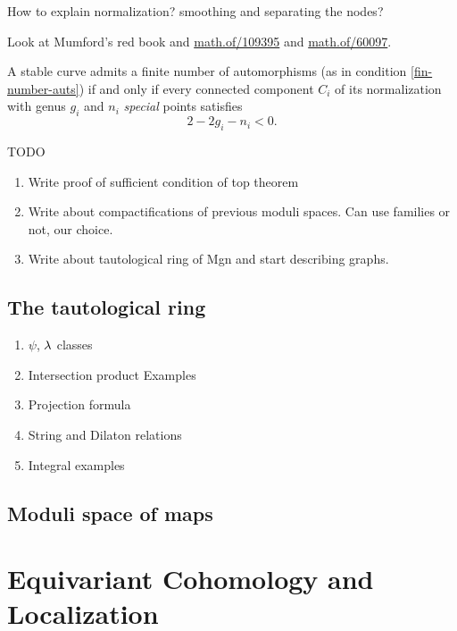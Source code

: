 \documentclass[12pt]{memoir}
\begin{document}
\begin{Qn}
    How to explain normalization? smoothing and separating the nodes?
\end{Qn}

Look at Mumford's red book and \href{https://mathoverflow.net/questions/109395/is-there-a-geometric-intuition-underlying-the-notion-of-normal-varieties}{math.of/109395} and \href{https://mathoverflow.net/questions/60097/checking-whether-a-variety-is-normal}{math.of/60097}.

\begin{Th}
A stable curve admits a finite number of automorphisms (as in condition \ref{fin-number-auts}) if and only if every connected component $C_i$ of its normalization with genus $g_i$ and $n_i$ \emph{special} points satisfies 
$$2-2g_i-n_i<0.$$
\end{Th}

TODO
\begin{enumerate}
    \item Write proof of sufficient condition of top theorem
    \item Write about compactifications of previous moduli spaces. Can use families or not, our choice.
    \item Write about tautological ring of Mgn and start describing graphs.
\end{enumerate}

\section{The tautological ring}

\begin{enumerate}
    \item $\psi$, $\lambda$ classes
    \item Intersection product Examples
    \item Projection formula
    \item String and Dilaton relations
    \item Integral examples
\end{enumerate}

\section{Moduli space of maps}

\chapter{Equivariant Cohomology and Localization}
\end{document}
